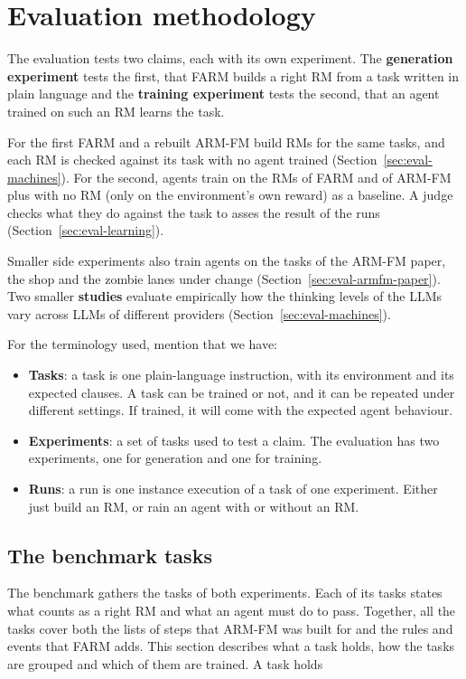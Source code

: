 \documentclass[11pt,english,listoffigures,listoftables]{tfgetsinf}
\begin{document}

\chapter{Evaluation methodology}
\label{chap:evaluation}
The evaluation tests two claims, each with its own experiment. The \textbf{generation experiment} tests the first, that FARM builds a right RM from a task written in plain language and the \textbf{training experiment} tests the second, that an agent trained on such an RM learns the task. 

For the first FARM and a rebuilt ARM-FM build RMs for the same tasks, and each RM is checked against its task with no agent trained (Section~\ref{sec:eval-machines}). For the second, agents train on the RMs of FARM and of ARM-FM plus with no RM (only on the environment's own reward) as a baseline. A judge checks what they do against the task to asses the result of the runs (Section~\ref{sec:eval-learning}). 

Smaller side experiments also train agents on the tasks of the ARM-FM paper, the shop and the zombie lanes under change (Section~\ref{sec:eval-armfm-paper}). Two smaller \textbf{studies} evaluate empirically how the thinking levels of the LLMs vary across LLMs of different providers (Section~\ref{sec:eval-machines}).

For the terminology used, mention that we have:
\begin{itemize}
    \item \textbf{Tasks}: a task is one plain-language instruction, with its environment and its expected clauses. A task can be trained or not, and it can be repeated under different settings. If trained, it will come with the expected agent behaviour.
    \item \textbf{Experiments}: a set of tasks used to test a claim. The evaluation has two experiments, one for generation and one for training.
    \item \textbf{Runs}: a run is one instance execution of a task of one experiment. Either just build an RM, or rain an agent with or without an RM. 
\end{itemize}

\section{The benchmark tasks}
\label{sec:eval-cards}
The benchmark gathers the tasks of both experiments. Each of its tasks states what counts as a right RM and what an agent must do to pass. Together, all the tasks cover both the lists of steps that ARM-FM was built for and the rules and events that FARM adds. This section describes what a task holds, how the tasks are grouped and which of them are trained. A task holds  
\end{document}
